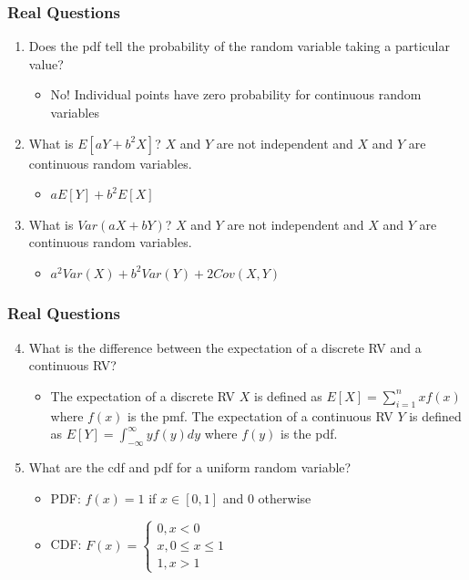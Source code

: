 \documentclass{beamer}
\begin{document}
\begin{frame}
\frametitle{Real Questions}
    \begin{enumerate}[<+- | alert@+>]
		\item Does the pdf tell the probability of the random variable taking a particular value?
			\begin{itemize}
				\item No! Individual points have zero probability for continuous random variables
			\end{itemize}			        
        \item What is $E[aY + b^2 X]$? $X$ and $Y$ are not independent and $X$ and $Y$ are continuous random variables.
            \begin{itemize}
                \item $aE[Y] + b^2 E[X]$
            \end{itemize}
        \item What is $Var(aX + bY)$? $X$ and $Y$ are not independent and $X$ and $Y$ are continuous random variables.
        	\begin{itemize}
        		\item $a^2 Var(X) + b^2 Var(Y) + 2 Cov(X, Y)$
        	\end{itemize}
    \end{enumerate}
\end{frame} 

\begin{frame}
\frametitle{Real Questions}
    \begin{enumerate}[<+- | alert@+>]
    \setcounter{enumi}{3}
        \item What is the difference between the expectation of a discrete RV and a continuous RV?
        	\begin{itemize}
        		\item The expectation of a discrete RV $X$ is defined as $E[X] = \sum_{i = 1}^n x f(x)$ where $f(x)$ is the pmf. The expectation of a continuous RV $Y$ is defined as $E[Y] = \int_{-\infty}^\infty y f(y) dy$ where $f(y)$ is the pdf. 
        	\end{itemize}
    \item What are the cdf and pdf for a uniform random variable?
    	\begin{itemize}
    		\item PDF: $f(x) = 1$ if $x \in [0, 1]$ and 0 otherwise
    		\item CDF: $ F(x) = \left\{ \begin{array}{l} 0, x < 0\\ x, 0\leq x \leq 1\\ 1, x > 1   \end{array}\right.$
    	\end{itemize}
    \end{enumerate}
\end{frame} 
\end{document}
